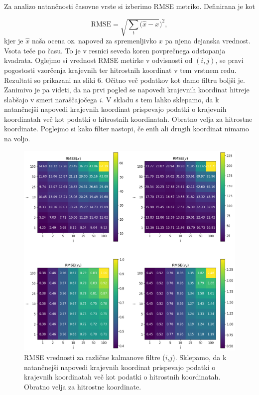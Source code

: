 \documentclass[slovene,11pt,a4paper]{article}
\begin{document}
Za analizo natančnosti časovne vrste si izberimo RMSE metriko. Definirana je kot

\begin{equation}
\text{RMSE} = \sqrt{\sum_t (\hat{x}-x})^2, 
\end{equation}
kjer je $\hat{x}$ naša ocena oz. napoved za spremenljivko $x$ pa njena dejanska vrednost. Vsota teče po času. To je v resnici seveda koren povprečnega odstopanja kvadrata. Oglejmo si vrednost RMSE metirke v odvisnosti od $(i,j)$, se pravi pogostosti vzorčenja krajevnih ter hitrostnih koordinat v tem vrstnem redu. Rezultati so prikazani na sliki 6. Očitno več podatkov kot damo filtru boljši je. Zanimivo je pa videti, da na prvi pogled se napovedi krajevnih koordinat hitreje slabšajo v smeri naraščajočega $i$. V skladu s tem lahko sklepamo, da k natančnejši napovedi krajevnih koordinat prispevajo podatki o krajevnih koordinatah več kot podatki o hitrostnih koordinatah. Obratno velja za hitrostne koordinate. Poglejmo si kako filter nastopi, če enih ali drugih koordinat nimamo na voljo.

\newpage

\begin{figure}[h!]
\centering
\includegraphics[width=14cm]{slika6.png}
\caption{RMSE vrednosti za različne kalmanove filtre ($i$,$j$). Sklepamo, da k natančnejši napovedi krajevnih koordinat prispevajo podatki o krajevnih koordinatah več kot podatki o hitrostnih koordinatah. Obratno velja za hitrostne koordinate.}
\end{figure}
\end{document}
